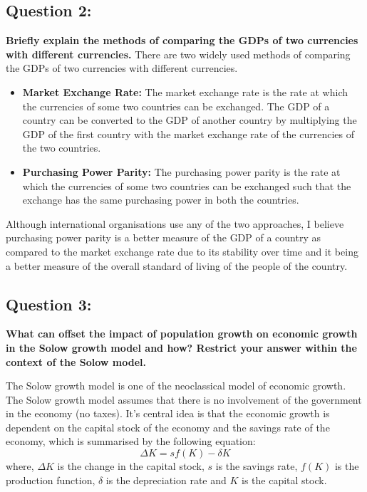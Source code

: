 \documentclass{article}
\begin{document}
\subsection*{Question 2:}
\textbf{Briefly explain the methods of comparing the GDPs of two currencies with different currencies.}
There are two widely used methods of comparing the GDPs of two currencies with different currencies.
\begin{itemize}
    \item \textbf{Market Exchange Rate:} The market exchange rate is the rate at which the currencies of some two countries 
          can be exchanged.
          The GDP of a country can be converted to the GDP of another country by multiplying the GDP of the first country 
          with the market exchange rate of the currencies of the two countries.
    \item \textbf{Purchasing Power Parity:} The purchasing power parity is the rate at which the currencies of some two countries 
          can be exchanged such that the exchange has the same purchasing power in both the countries.
\end{itemize}
Although international organisations use any of the two approaches, I believe purchasing power parity is a better measure of 
the GDP of a country as compared to the market exchange rate due to its stability over time and it being a better measure of the
overall standard of living of the people of the country.




\subsection*{Question 3:}
\textbf{What can offset the impact of population growth on economic growth in the Solow growth model and how? 
Restrict your answer within the context of the Solow model.}

The Solow growth model is one of the neoclassical model of economic growth.
The Solow growth model assumes that there is no involvement of the government in the economy (no taxes).
It's central idea is that the economic growth is dependent on the capital stock of the economy and the savings rate of the economy,
which is summarised by the following equation:
\begin{equation}
    \Delta K = sf(K) - \delta K 
\end{equation}
where, $\Delta K$ is the change in the capital stock, $s$ is the savings rate, $f(K)$ is the production function, $\delta$ is the depreciation rate and $K$ is the capital stock.
\end{document}
